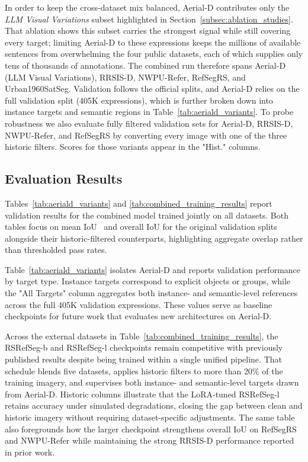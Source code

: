 \documentclass[journal]{IEEEtran}
\begin{document}
In order to keep the cross-dataset mix balanced, Aerial-D contributes only the \emph{LLM Visual Variations} subset highlighted in Section~\ref{subsec:ablation_studies}. That ablation shows this subset carries the strongest signal while still covering every target; limiting Aerial-D to these expressions keeps the millions of available sentences from overwhelming the four public datasets, each of which supplies only tens of thousands of annotations. The combined run therefore spans Aerial-D (LLM Visual Variations), RRSIS-D\cite{liu2024rotated}, NWPU-Refer\cite{yang2024large}, RefSegRS\cite{yuan2023rrsis}, and Urban1960SatSeg\cite{hao2025urban1960satseg}. Validation follows the official splits, and Aerial-D relies on the full validation split (405K expressions), which is further broken down into instance targets and semantic regions in Table~\ref{tab:aeriald_variants}. To probe robustness we also evaluate fully filtered validation sets for Aerial-D, RRSIS-D, NWPU-Refer, and RefSegRS by converting every image with one of the three historic filters. Scores for those variants appear in the "Hist." columns.

\subsection{Evaluation Results}
\label{subsec:evaluation_results}

Tables~\ref{tab:aeriald_variants} and \ref{tab:combined_training_results} report validation results for the combined model trained jointly on all datasets. Both tables focus on mean IoU~\cite{everingham2010pascal} and overall IoU for the original validation splits alongside their historic-filtered counterparts, highlighting aggregate overlap rather than thresholded pass rates.

Table~\ref{tab:aeriald_variants} isolates Aerial-D and reports validation performance by target type. Instance targets correspond to explicit objects or groups, while the "All Targets" column aggregates both instance- and semantic-level references across the full 405K validation expressions. These values serve as baseline checkpoints for future work that evaluates new architectures on Aerial-D.

Across the external datasets in Table~\ref{tab:combined_training_results}, the RSRefSeg-b and RSRefSeg-l checkpoints remain competitive with previously published results despite being trained within a single unified pipeline. That schedule blends five datasets, applies historic filters to more than 20\% of the training imagery, and supervises both instance- and semantic-level targets drawn from Aerial-D. Historic columns illustrate that the LoRA-tuned RSRefSeg-l retains accuracy under simulated degradations, closing the gap between clean and historic imagery without requiring dataset-specific adjustments. The same table also foregrounds how the larger checkpoint strengthens overall IoU on RefSegRS and NWPU-Refer while maintaining the strong RRSIS-D performance reported in prior work.
\end{document}
